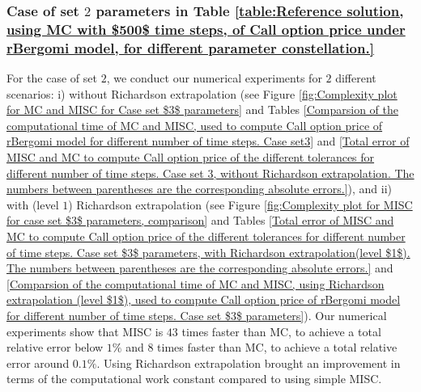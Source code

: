 \FloatBarrier

\subsubsection{Case of set $2$ parameters in Table \ref{table:Reference solution, using MC with $500$ time steps, of Call option price under rBergomi model, for different parameter constellation.}}\label{sec:Case of set 3 parameters}

For the case of set $2$, we conduct our numerical experiments for $2$ different scenarios: i) without Richardson extrapolation (see Figure \ref{fig:Complexity plot for MC and MISC for Case set $3$ parameters} and Tables \ref{Comparsion of the computational time of  MC and MISC, used to compute Call option price of rBergomi model for different number of time steps. Case set3} and \ref{Total error of MISC and MC to compute Call option price of the different tolerances for different number of time steps. Case set 3, without Richardson extrapolation. The numbers between parentheses are the corresponding absolute errors.}), and  ii) with (level $1$) Richardson extrapolation  (see Figure \ref{fig:Complexity plot for  MISC for case set $3$ parameters, comparison} and Tables \ref{Total  error of MISC and MC to compute Call option price of the different tolerances for different number of time steps. Case set $3$ parameters, with Richardson extrapolation(level $1$). The numbers between parentheses are the corresponding absolute errors.} and \ref{Comparsion of the computational time of  MC and MISC, using Richardson extrapolation (level $1$), used to compute Call option price of rBergomi model for different number of time steps. Case set $3$ parameters}). Our numerical experiments show that MISC is  $43$ times faster than MC, to achieve  a total relative error below $1\%$ and $8$ times faster than MC, to achieve a total relative error around $0.1\%$. Using Richardson extrapolation brought an improvement in terms of the  computational work constant compared to using simple MISC.


